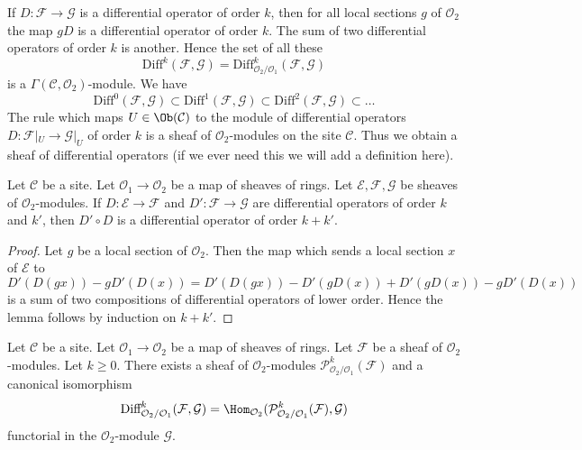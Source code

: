 \noindent
If $D : \mathcal{F} \to \mathcal{G}$ is a differential operator of order $k$,
then for all local sections $g$ of $\mathcal{O}_2$ the map $gD$ is a
differential operator of order $k$. The sum of two differential operators of
order $k$ is another. Hence the set of all these
$$
\text{Diff}^k(\mathcal{F}, \mathcal{G}) =
\text{Diff}^k_{\mathcal{O}_2/\mathcal{O}_1}(\mathcal{F}, \mathcal{G})
$$
is a $\Gamma(\mathcal{C}, \mathcal{O}_2)$-module. We have
$$
\text{Diff}^0(\mathcal{F}, \mathcal{G}) \subset
\text{Diff}^1(\mathcal{F}, \mathcal{G}) \subset
\text{Diff}^2(\mathcal{F}, \mathcal{G}) \subset \ldots
$$
The rule which maps $U \in \Ob(\mathcal{C})$ to the module of
differential operators $D : \mathcal{F}|_U \to \mathcal{G}|_U$
of order $k$ is a sheaf of $\mathcal{O}_2$-modules on the site $\mathcal{C}$.
Thus we obtain a sheaf of differential operators (if we ever need this we will
add a definition here).

\begin{lemma}
\label{lemma-composition-differential-operators}
Let $\mathcal{C}$ be a site.
Let $\mathcal{O}_1 \to \mathcal{O}_2$ be a map of sheaves of rings.
Let $\mathcal{E}, \mathcal{F}, \mathcal{G}$ be sheaves of
$\mathcal{O}_2$-modules.
If $D : \mathcal{E} \to \mathcal{F}$ and $D' : \mathcal{F} \to \mathcal{G}$
are differential operators of order $k$ and $k'$, then $D' \circ D$ is a
differential operator of order $k + k'$.
\end{lemma}

\begin{proof}
Let $g$ be a local section of $\mathcal{O}_2$.
Then the map which sends a local section $x$ of $\mathcal{E}$ to
$$
D'(D(gx)) - gD'(D(x)) = D'(D(gx)) - D'(gD(x)) + D'(gD(x)) - gD'(D(x))
$$
is a sum of two compositions of differential operators of lower order.
Hence the lemma follows by induction on $k + k'$.
\end{proof}

\begin{lemma}
\label{lemma-module-principal-parts}
Let $\mathcal{C}$ be a site.
Let $\mathcal{O}_1 \to \mathcal{O}_2$ be a map of sheaves of rings.
Let $\mathcal{F}$ be a sheaf of $\mathcal{O}_2$-modules.
Let $k \geq 0$. There exists a sheaf of $\mathcal{O}_2$-modules
$\mathcal{P}^k_{\mathcal{O}_2/\mathcal{O}_1}(\mathcal{F})$
and a canonical isomorphism
$$
\text{Diff}^k_{\mathcal{O}_2/\mathcal{O}_1}(\mathcal{F}, \mathcal{G}) =
\Hom_{\mathcal{O}_2}(
\mathcal{P}^k_{\mathcal{O}_2/\mathcal{O}_1}(\mathcal{F}), \mathcal{G})
$$
functorial in the $\mathcal{O}_2$-module $\mathcal{G}$.
\end{lemma}

